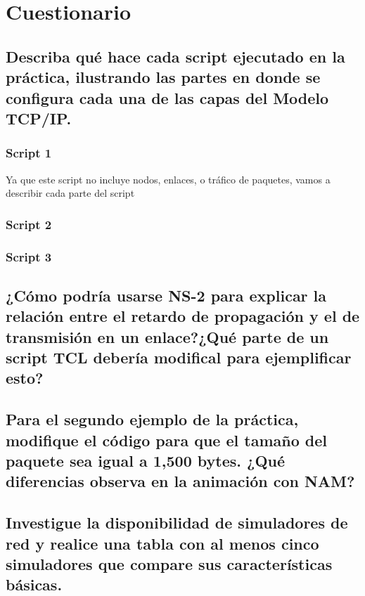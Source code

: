 \section*{Cuestionario}

\subsection*{Describa qu\'e hace cada script ejecutado en la pr\'actica, ilustrando las partes en donde se configura cada una de las
capas del Modelo TCP/IP.}

\subsubsection*{Script 1}
\noindent Ya que este script no incluye nodos, enlaces, o tr\'afico de paquetes, vamos a describir cada parte del script

\subsubsection*{Script 2}

\subsubsection*{Script 3}

\subsection*{¿C\'omo podr\'ia usarse NS-2 para explicar la relaci\'on entre el retardo de propagaci\'on y el de transmisi\'on en un
enlace?¿Qu\'e parte de un script TCL deber\'ia modifical para ejemplificar esto?}

\subsection*{Para el segundo ejemplo de la pr\'actica, modifique el c\'odigo para que el tamaño del paquete sea igual a 1,500 bytes.
¿Qu\'e diferencias observa en la animaci\'on con NAM?}

\subsection*{Investigue la disponibilidad de simuladores de red y realice una tabla con al menos cinco simuladores que compare sus
caracter\'isticas b\'asicas.}
